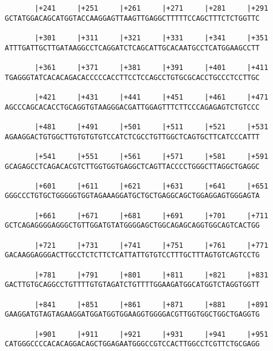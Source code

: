 \documentclass{article}
\begin{document}
\begin{Verbatim}
       |+241     |+251     |+261     |+271     |+281     |+291
GCTATGGACAGCATGGTACCAAGGAGTTAAGTTGAGGCTTTTTCCAGCTTTCTCTGGTTC
                                                            
       |+301     |+311     |+321     |+331     |+341     |+351
ATTTGATTGCTTGATAAGGCCTCAGGATCTCAGCATTGCACAATGCCTCATGGAAGCCTT
                                                            
       |+361     |+371     |+381     |+391     |+401     |+411
TGAGGGTATCACACAGACACCCCCACCTTCCTCCAGCCTGTGCGCACCTGCCCTCCTTGC
                                                            
       |+421     |+431     |+441     |+451     |+461     |+471
AGCCCAGCACACCTGCAGGTGTAAGGGACGATTGGAGTTTCTTCCCAGAGAGTCTGTCCC
                                                            
       |+481     |+491     |+501     |+511     |+521     |+531
AGAAGGACTGTGGCTTGTGTGTGTCCATCTCGCCTGTTGGCTCAGTGCTTCATCCCATTT
                                                            
       |+541     |+551     |+561     |+571     |+581     |+591
GCAGAGCCTCAGACACGTCTTGGTGGTGAGGCTCAGTTACCCCTGGGCTTAGGCTGAGGC
                                                            
       |+601     |+611     |+621     |+631     |+641     |+651
GGGCCCTGTGCTGGGGGTGGTAGAAAGGATGCTGCTGAGGCAGCTGGAGGAGTGGGAGTA
                                                            
       |+661     |+671     |+681     |+691     |+701     |+711
GCTCAGAGGGGAGGGCTGTTGGATGTATGGGGAGCTGGCAGAGCAGGTGGCAGTCACTGG
                                                            
       |+721     |+731     |+741     |+751     |+761     |+771
GACAAGGAGGGACTTGCCTCTCTTCTCATTATTGTGTCCTTTGCTTTAGTGTCAGTCCTG
                                                            
       |+781     |+791     |+801     |+811     |+821     |+831
GACTTGTGCAGGCCTGTTTTGTGTAGATCTGTTTTGGAAGATGGCATGGTCTAGGTGGTT
                                                            
       |+841     |+851     |+861     |+871     |+881     |+891
GAAGGATGTAGTAGAAGGATGGATGGTGGAAGGTGGGGACGTTGGTGGCTGGCTGAGGTG
                                                            
       |+901     |+911     |+921     |+931     |+941     |+951
CATGGGCCCCACACAGGACAGCTGGAGAATGGGCCGTCCACTTGGCCTCGTTCTGCGAGG
                                                            

\end{Verbatim}
\end{document}
